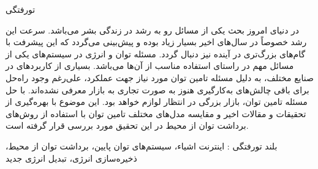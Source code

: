 

‌تورفتگی

در دنیای امروز بحث  یکی از مسائل رو به رشد در زندگی بشر می‌باشد. سرعت این رشد خصوصاً در سال‌های اخیر بسیار زیاد بوده و پیش‌بینی می‌گردد که این پیشرفت با گام‌های بزرگ‌تری در آینده نیز دنبال گردد. مسئله توان و انرژی در سیستم‌های  یکی از مسائل مهم در راستای استفاده مناسب از آن‌ها می‌باشد. بسیاری از کاربردهای  در صنایع مختلف، به دلیل مسئله تامین توان مورد نیاز جهت عملکرد، علی‌رغم وجود راه‌حل برای باقی چالش‌های به‌کارگیری هنوز به صورت تجاری به بازار معرفی نشده‌اند. با حل مسئله تامین توان، بازار بزرگی در انتظار لوازم  خواهد بود. این موضوع با بهره‌گیری از تحقیقات و مقالات اخیر و مقایسه مدل‌های مختلف تامین توان با استفاده از روش‌های برداشت توان از محیط در این تحقیق مورد بررسی قرار گرفته است.





‌بلند
‌تورفتگی : 
اینترنت اشیاء، سیستم‌های توان پایین، برداشت توان از محیط، ذخیره‌سازی انرژی، تبدیل انرژی
‌جدید
